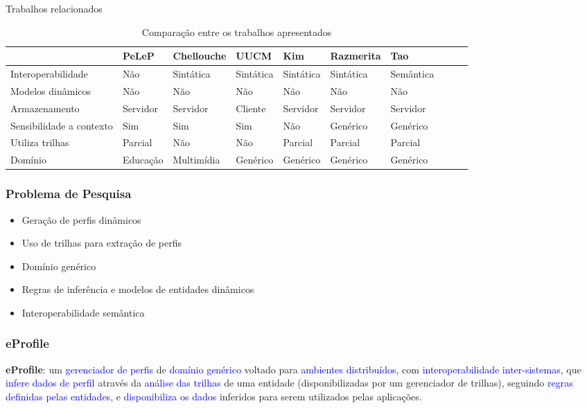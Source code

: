 \documentclass[14pt]{beamer}
\begin{document}

\begin{frame}{Trabalhos relacionados}

	\begin{table}\centering\fontsize{7}{13}\selectfont
  \begin{tabular*}{1\textwidth}{@{}llllllllll@{}}
    \toprule
    			      & PeLeP    & Chellouche & UUCM      & Kim       & Razmerita & Tao \\
    \midrule
    Interoperabilidade        & Não      & Sintática  & Sintática & Sintática & Sintática & Semântica \\
    Modelos dinâmicos         & Não      & Não        & Não       & Não       & Não       & Não \\
    Armazenamento             & Servidor & Servidor   & Cliente   & Servidor  & Servidor  & Servidor \\
    Sensibilidade a contexto  & Sim      & Sim        & Sim       & Não       & Genérico  & Genérico \\
    Utiliza trilhas           & Parcial  & Não        & Não       & Parcial   & Parcial   & Parcial \\
    Domínio                   & Educação & Multimídia & Genérico  & Genérico  & Genérico  & Genérico \\
    \bottomrule
  \end{tabular*}
  \caption{Comparação entre os trabalhos apresentados}
  \label{tab:comparacao}
\end{table}

\end{frame}


\begin{frame}
  \frametitle{Problema de Pesquisa}
  \begin{itemize}
    \item Geração de perfis dinâmicos
    \item Uso de trilhas para extração de perfis
    \item Domínio genérico
    \item Regras de inferência e modelos de entidades dinâmicos
    \item Interoperabilidade semântica
  \end{itemize}
\end{frame}


\begin{frame}
  \frametitle{eProfile}
\textbf{eProfile}: um \textcolor{blue}{gerenciador de perfis} de \textcolor{blue}{domínio genérico} voltado para \textcolor{blue}{ambientes distribuídos}, com \textcolor{blue}{interoperabilidade inter-sistemas}, que \textcolor{blue}{infere dados de perfil} através da \textcolor{blue}{análise das trilhas} de uma entidade (disponibilizadas por um gerenciador de trilhas), seguindo \textcolor{blue}{regras definidas pelas entidades}, e \textcolor{blue}{disponibiliza os dados} inferidos para serem utilizados pelas aplicações.
\end{frame}
\end{document}
